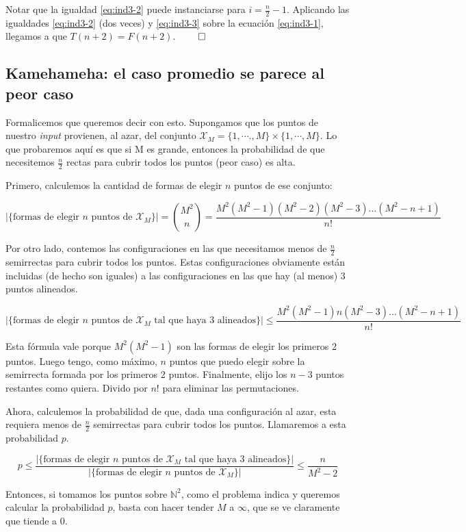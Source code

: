   Notar que la igualdad \ref{eq:ind3-2} puede instanciarse para $i = \frac{n}{2}-1$. 
  Aplicando las igualdades \ref{eq:ind3-2} (dos veces) y \ref{eq:ind3-3} sobre la ecuación \ref{eq:ind3-1}, llegamos a que $T(n + 2) = F(n + 2)$. $\qed$


\subsection{Kamehameha: el caso promedio se parece al peor caso}

Formalicemos que queremos decir con esto. Supongamos que los puntos de nuestro \emph{input} provienen, al azar, del conjunto $\mathcal{X}_M = \{1, \cdots., M\} \times \{1, \cdots, M\}$. Lo que probaremos aquí es que si M es grande, entonces la probabilidad de que necesitemos $\frac{n}{2}$ rectas para cubrir todos los puntos (peor caso) es alta.

Primero, calculemos la cantidad de formas de elegir $n$ puntos de ese conjunto:

\[|\{\text{formas de elegir $n$ puntos de $\mathcal{X}_M$} \}| = \binom{M^2}{n} = \frac{M^2 (M^2 - 1) (M^2 - 2) (M^2 - 3) \dots (M^2 - n + 1)}{n!}\]

Por otro lado, contemos las configuraciones en las que necesitamos menos de $\frac{n}2$ semirrectas para cubrir todos los puntos. Estas configuraciones obviamente están incluidas (de hecho son iguales) a las configuraciones en las que hay (al menos) 3 puntos alineados.

\[|\{\text{formas de elegir $n$ puntos de $\mathcal{X}_M$ tal que haya 3 alineados}\}| \leq \frac{M^2 (M^2 - 1) n (M^2 - 3) \dots (M^2 - n + 1)}{n!}\]

Esta fórmula vale porque $M^2 (M^2 - 1)$ son las formas de elegir los primeros 2 puntos. Luego tengo, como máximo, $n$ puntos que puedo elegir sobre la semirrecta formada por los primeros 2 puntos. Finalmente, elijo los $n - 3$ puntos restantes como quiera. Divido por $n!$ para eliminar las permutaciones.

Ahora, calculemos la probabilidad de que, dada una configuración al azar, esta requiera menos de $\frac{n}2$ semirrectas para cubrir todos los puntos. Llamaremos a esta probabilidad $p$.

\[p \leq \frac{|\{\text{formas de elegir $n$ puntos de $\mathcal{X}_M$ tal que haya 3 alineados} \}|}{|\{\text{formas de elegir $n$ puntos de $\mathcal{X}_M$} \}|} \leq \frac{n} {M^2 - 2}\]


Entonces, si tomamos los puntos sobre $\mathbb{N}^2$, como el problema indica y queremos calcular la probabilidad $p$, basta con hacer tender $M$ a $\infty$, que se ve claramente que tiende a 0.

